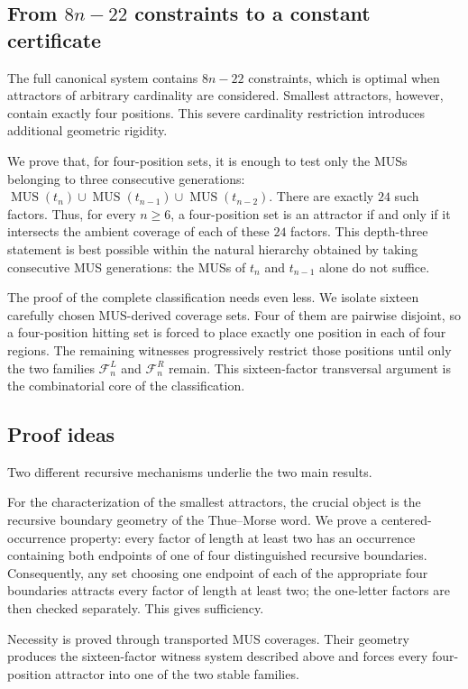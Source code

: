 \documentclass[10pt,a4paper]{article}
\theoremstyle{definition}\newtheorem{definition}[theorem]{Definition}
\theoremstyle{remark}\newtheorem{remark}[theorem]{Remark}
\newcommand{\MUS}{\operatorname{MUS}}
\newcommand{\FL}{\mathcal{F}^{L}}
\newcommand{\FR}{\mathcal{F}^{R}}
\begin{document}
\subsection{From \texorpdfstring{$8n-22$}{8n-22} constraints to a constant certificate}
The full canonical system contains $8n-22$ constraints, which is optimal when attractors of arbitrary cardinality are considered. Smallest attractors, however, contain exactly four positions. This severe cardinality restriction introduces additional geometric rigidity.

We prove that, for four-position sets, it is enough to test only the MUSs belonging to three consecutive generations:
$
\MUS(t_n)\cup\MUS(t_{n-1})\cup\MUS(t_{n-2}).
$
There are exactly $24$ such factors. Thus, for every $n\geq6$, a four-position set is an attractor if and only if it intersects the ambient coverage of each of these $24$ factors. This depth-three statement is best possible within the natural hierarchy obtained by taking consecutive MUS generations: the MUSs of $t_n$ and $t_{n-1}$ alone do not suffice.

The proof of the complete classification needs even less. We isolate sixteen carefully chosen MUS-derived coverage sets. Four of them are pairwise disjoint, so a four-position hitting set is forced to place exactly one position in each of four regions. The remaining witnesses progressively restrict those positions until only the two families $\FL_n$ and $\FR_n$ remain. This sixteen-factor transversal argument is the combinatorial core of the classification.

\subsection{Proof ideas}
Two different recursive mechanisms underlie the two main results.

For the characterization of the smallest attractors, the crucial object is the recursive boundary geometry of the Thue--Morse word. We prove a centered-occurrence property: every factor of length at least two has an occurrence containing both endpoints of one of four distinguished recursive boundaries. Consequently, any set choosing one endpoint of each of the appropriate four boundaries attracts every factor of length at least two; the one-letter factors are then checked separately. This gives sufficiency.

Necessity is proved through transported MUS coverages. Their geometry produces the sixteen-factor witness system described above and forces every four-position attractor into one of the two stable families.
\end{document}
